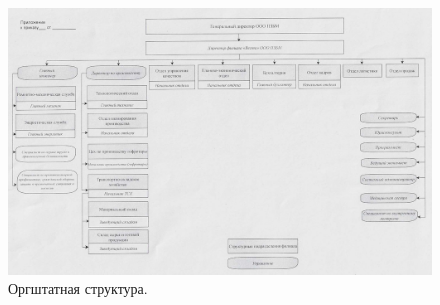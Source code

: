 


\begin{figure}
\begin{center}
  \includegraphics[height=1.2\textheight, width=\textwidth, angle=90, keepaspectratio]{Pics/Структура.jpg}
\end{center}
  \caption{Оргштатная структура. \FIRMA}
  \label{pic:Структура.jpg}
\end{figure}



\clearpage

